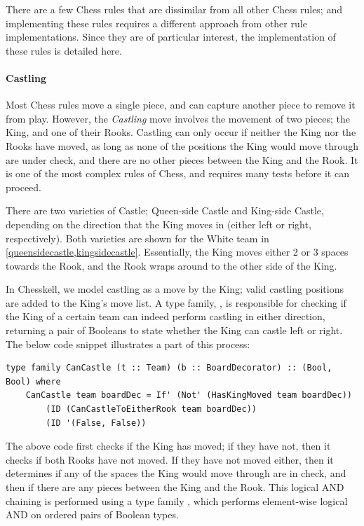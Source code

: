 There are a few Chess rules that are dissimilar from all other Chess rules; and implementing these rules requires a different approach from other rule implementations. Since they are of particular interest, the implementation of these rules is detailed here.

\paragraph{Castling} \label{castlesection}

Most Chess rules move a single piece, and can capture another piece to remove it from play. However, the \emph{Castling} move involves the movement of two pieces; the King, and one of their Rooks. Castling can only occur if neither the King nor the Rooks have moved, as long as none of the positions the King would move through are under check, and there are no other pieces between the King and the Rook. It is one of the most complex rules of Chess, and requires many tests before it can proceed.

There are two varieties of Castle; Queen-side Castle and King-side Castle, depending on the direction that the King moves in (either left or right, respectively). Both varieties are shown for the White team in \cref{queensidecastle,kingsidecastle}. Essentially, the King moves either 2 or 3 spaces towards the Rook, and the Rook wraps around to the other side of the King.

In Chesskell, we model castling as a move by the King; valid castling positions are added to the King's move list. A type family, , is responsible for checking if the King of a certain team can indeed perform castling in either direction, returning a pair of Booleans to state whether the King can castle left or right. The below code snippet illustrates a part of this process:

\begin{lstlisting}
type family CanCastle (t :: Team) (b :: BoardDecorator) :: (Bool, Bool) where
    CanCastle team boardDec = If' (Not' (HasKingMoved team boardDec))
        (ID (CanCastleToEitherRook team boardDec))
        (ID '(False, False))
\end{lstlisting}

The above code first checks if the King has moved; if they have not, then it checks if both Rooks have not moved. If they have not moved either, then it determines if any of the spaces the King would move through are in check, and then if there are any pieces between the King and the Rook. This logical AND chaining is performed using a type family , which performs element-wise logical AND on ordered pairs of Boolean types.

